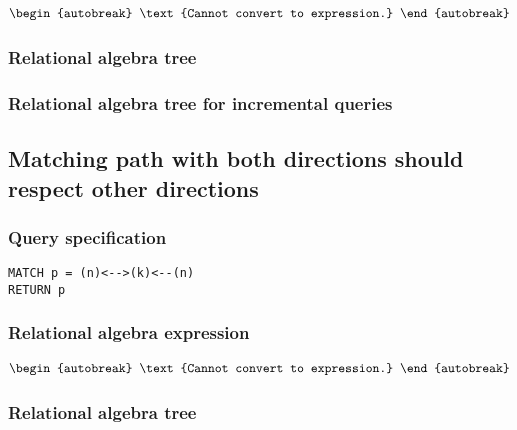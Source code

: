 \begin{align*}
\begin{autobreak}
\text{Cannot convert to expression.}
\end{autobreak}
\end{align*}

\subsubsection*{Relational algebra tree}


\subsubsection*{Relational algebra tree for incremental queries}


\subsection{Matching path with both directions should respect other directions}

\subsubsection*{Query specification}

\begin{lstlisting}
MATCH p = (n)<-->(k)<--(n)
RETURN p
\end{lstlisting}

\subsubsection*{Relational algebra expression}

\begin{align*}
\begin{autobreak}
\text{Cannot convert to expression.}
\end{autobreak}
\end{align*}

\subsubsection*{Relational algebra tree}


